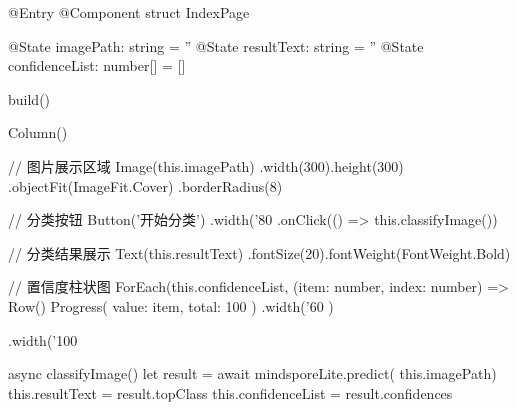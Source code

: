 \begin{codeblock}[caption={ArkTS主界面代码}]
@Entry
@Component
struct IndexPage {
  @State imagePath: string = ''
  @State resultText: string = ''
  @State confidenceList: number[] = []

  build() {
    Column() {
      // 图片展示区域
      Image(this.imagePath)
        .width(300).height(300)
        .objectFit(ImageFit.Cover)
        .borderRadius(8)

      // 分类按钮
      Button('开始分类')
        .width('80%
        .onClick(() => this.classifyImage())

      // 分类结果展示
      Text(this.resultText)
        .fontSize(20).fontWeight(FontWeight.Bold)

      // 置信度柱状图
      ForEach(this.confidenceList,
        (item: number, index: number) => {
          Row() {
            Progress({ value: item, total: 100 })
              .width('60%
          }
        })
    }.width('100%
  }

  async classifyImage() {
    let result = await mindsporeLite.predict(
      this.imagePath)
    this.resultText = result.topClass
    this.confidenceList = result.confidences
  }
}
\end{codeblock}